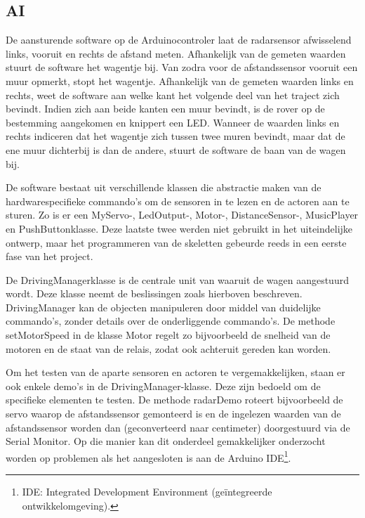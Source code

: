  
\subsection{AI}
De aansturende software op de Arduinocontroler laat de radarsensor afwisselend links, vooruit en rechts de afstand meten. Afhankelijk van de gemeten waarden stuurt de software het wagentje bij.
Van zodra voor de afstandssensor vooruit een muur opmerkt, stopt het wagentje. Afhankelijk van de gemeten waarden links en rechts, weet de software aan welke kant het volgende deel van het traject zich bevindt.
Indien zich aan beide kanten een muur bevindt, is de rover op de bestemming aangekomen en knippert een LED.
Wanneer de waarden links en rechts indiceren dat het wagentje zich tussen twee muren bevindt, maar dat de ene muur dichterbij is dan de andere, stuurt de software de baan van de wagen bij.

De software bestaat uit verschillende klassen die abstractie maken van de hardwarespecifieke commando's om de sensoren in te lezen en de actoren aan te sturen.
Zo is er een MyServo-, LedOutput-, Motor-, DistanceSensor-, MusicPlayer en PushButtonklasse. Deze laatste twee werden niet gebruikt in het uiteindelijke ontwerp, maar het programmeren van de skeletten gebeurde reeds in een eerste fase van het project.

De DrivingManagerklasse is de centrale unit van waaruit de wagen aangestuurd wordt. Deze klasse neemt de beslissingen zoals hierboven beschreven. 
DrivingManager kan de objecten manipuleren door middel van duidelijke commando's, zonder details over de onderliggende commando's. 
De methode setMotorSpeed in de klasse Motor regelt zo bijvoorbeeld de snelheid van de motoren en de staat van de relais, zodat ook achteruit gereden kan worden.

Om het testen van de aparte sensoren en actoren te vergemakkelijken, staan er ook enkele demo's in de DrivingManager-klasse. Deze zijn bedoeld om de specifieke elementen te testen. 
De methode radarDemo roteert bijvoorbeeld de servo waarop de afstandssensor gemonteerd is en de ingelezen waarden van de afstandssensor worden dan (geconverteerd naar centimeter) doorgestuurd via de Serial Monitor. Op die manier kan dit onderdeel gemakkelijker onderzocht worden op problemen als het aangesloten is aan de Arduino IDE\footnote{IDE: Integrated Development Environment (geïntegreerde ontwikkelomgeving).}.